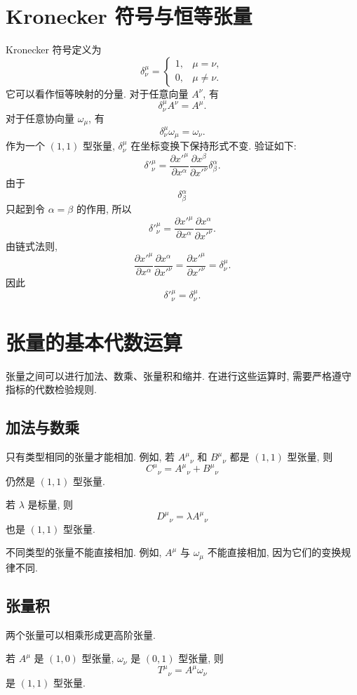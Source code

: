 \section{Kronecker 符号与恒等张量}

Kronecker 符号定义为
\[
\delta^\mu_\nu
=
\begin{cases}
1,& \mu=\nu,\\
0,& \mu\neq\nu.
\end{cases}
\]
它可以看作恒等映射的分量. 对于任意向量 $A^\nu$, 有
\[
\delta^\mu_\nu A^\nu=A^\mu.
\]
对于任意协向量 $\omega_\mu$, 有
\[
\delta^\mu_\nu\omega_\mu=\omega_\nu.
\]
作为一个 $(1,1)$ 型张量, $\delta^\mu_\nu$ 在坐标变换下保持形式不变. 验证如下: 
\[
\delta'^\mu_\nu
=
\frac{\partial x'^\mu}{\partial x^\alpha}
\frac{\partial x^\beta}{\partial x'^\nu}
\delta^\alpha_\beta.
\]
由于
\[
\delta^\alpha_\beta
\]
只起到令 $\alpha=\beta$ 的作用, 所以
\[
\delta'^\mu_\nu
=
\frac{\partial x'^\mu}{\partial x^\alpha}
\frac{\partial x^\alpha}{\partial x'^\nu}.
\]
由链式法则, 
\[
\frac{\partial x'^\mu}{\partial x^\alpha}
\frac{\partial x^\alpha}{\partial x'^\nu}
=
\frac{\partial x'^\mu}{\partial x'^\nu}
=
\delta^\mu_\nu.
\]
因此
\[
\delta'^\mu_\nu=\delta^\mu_\nu.
\]
\section{张量的基本代数运算}

张量之间可以进行加法、数乘、张量积和缩并. 在进行这些运算时, 需要严格遵守指标的代数检验规则. 

\subsection{加法与数乘}

只有类型相同的张量才能相加. 例如, 若 $A^\mu{}_\nu$ 和 $B^\mu{}_\nu$ 都是 $(1,1)$ 型张量, 则
\[
C^\mu{}_\nu
=
A^\mu{}_\nu+B^\mu{}_\nu
\]
仍然是 $(1,1)$ 型张量. 

若 $\lambda$ 是标量, 则
\[
D^\mu{}_\nu
=
\lambda A^\mu{}_\nu
\]
也是 $(1,1)$ 型张量. 

不同类型的张量不能直接相加. 例如, $A^\mu$ 与 $\omega_\mu$ 不能直接相加, 因为它们的变换规律不同. 

\subsection{张量积}

两个张量可以相乘形成更高阶张量. 

若 $A^\mu$ 是 $(1,0)$ 型张量, $\omega_\nu$ 是 $(0,1)$ 型张量, 则
\[
T^\mu{}_\nu
=
A^\mu\omega_\nu
\]
是 $(1,1)$ 型张量. 

